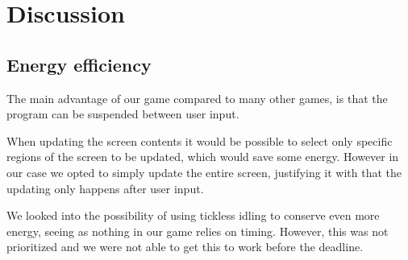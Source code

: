 \section{Discussion}

\subsection{Energy efficiency}
The main advantage of our game compared to many other games, is that the program can be suspended between user input.

When updating the screen contents it would be possible to select only specific regions of the screen to be updated, which would save some energy.
However in our case we opted to simply update the entire screen, justifying it with that the updating only happens after user input.

We looked into the possibility of using tickless idling to conserve even more energy,
seeing as nothing in our game relies on timing.
However, this was not prioritized and we were not able to get this to work before the deadline.
